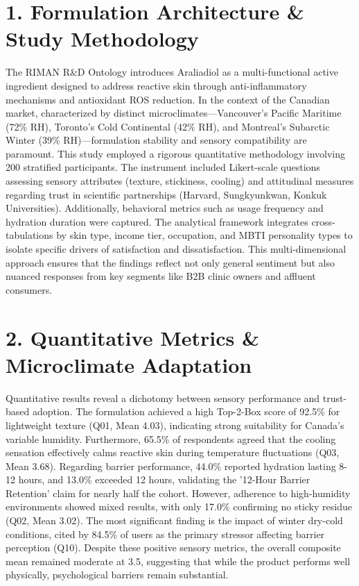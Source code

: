 \documentclass[10pt,twocolumn,a4paper]{article}
\begin{document}
\section{1. Formulation Architecture \& Study Methodology}
The RIMAN R\&D Ontology introduces Araliadiol as a multi-functional active ingredient designed to address reactive skin through anti-inflammatory mechanisms and antioxidant ROS reduction. In the context of the Canadian market, characterized by distinct microclimates—Vancouver’s Pacific Maritime (72\% RH), Toronto’s Cold Continental (42\% RH), and Montreal’s Subarctic Winter (39\% RH)—formulation stability and sensory compatibility are paramount. This study employed a rigorous quantitative methodology involving 200 stratified participants. The instrument included Likert-scale questions assessing sensory attributes (texture, stickiness, cooling) and attitudinal measures regarding trust in scientific partnerships (Harvard, Sungkyunkwan, Konkuk Universities). Additionally, behavioral metrics such as usage frequency and hydration duration were captured. The analytical framework integrates cross-tabulations by skin type, income tier, occupation, and MBTI personality types to isolate specific drivers of satisfaction and dissatisfaction. This multi-dimensional approach ensures that the findings reflect not only general sentiment but also nuanced responses from key segments like B2B clinic owners and affluent consumers.
\section{2. Quantitative Metrics \& Microclimate Adaptation}
Quantitative results reveal a dichotomy between sensory performance and trust-based adoption. The formulation achieved a high Top-2-Box score of 92.5\% for lightweight texture (Q01, Mean 4.03), indicating strong suitability for Canada’s variable humidity. Furthermore, 65.5\% of respondents agreed that the cooling sensation effectively calms reactive skin during temperature fluctuations (Q03, Mean 3.68). Regarding barrier performance, 44.0\% reported hydration lasting 8-12 hours, and 13.0\% exceeded 12 hours, validating the '12-Hour Barrier Retention' claim for nearly half the cohort. However, adherence to high-humidity environments showed mixed results, with only 17.0\% confirming no sticky residue (Q02, Mean 3.02). The most significant finding is the impact of winter dry-cold conditions, cited by 84.5\% of users as the primary stressor affecting barrier perception (Q10). Despite these positive sensory metrics, the overall composite mean remained moderate at 3.5, suggesting that while the product performs well physically, psychological barriers remain substantial.
\end{document}
